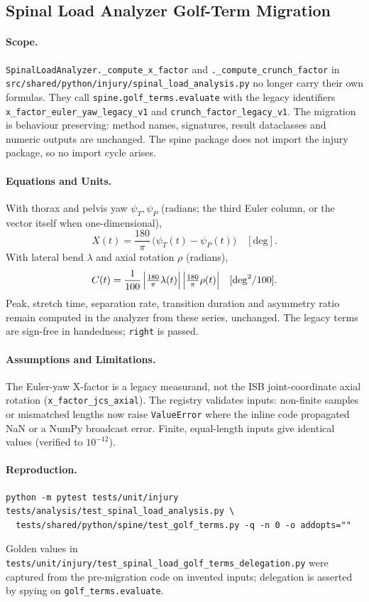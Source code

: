\subsection{Spinal Load Analyzer Golf-Term Migration}

\paragraph{Scope.}
\texttt{SpinalLoadAnalyzer.\_compute\_x\_factor} and
\texttt{.\_compute\_crunch\_factor} in
\texttt{src/shared/python/injury/spinal\_load\_analysis.py} no longer carry their
own formulas. They call \texttt{spine.golf\_terms.evaluate} with the legacy
identifiers \texttt{x\_factor\_euler\_yaw\_legacy\_v1} and
\texttt{crunch\_factor\_legacy\_v1}. The migration is behaviour preserving:
method names, signatures, result dataclasses and numeric outputs are unchanged.
The spine package does not import the injury package, so no import cycle arises.

\paragraph{Equations and Units.}
With thorax and pelvis yaw $\psi_T,\psi_P$ (radians; the third Euler column, or
the vector itself when one-dimensional),
\begin{equation}
  X(t) = \frac{180}{\pi}\,\bigl(\psi_T(t)-\psi_P(t)\bigr)\quad[\mathrm{deg}].
\end{equation}
With lateral bend $\lambda$ and axial rotation $\rho$ (radians),
\begin{equation}
  C(t) = \frac{1}{100}\,\Bigl|\tfrac{180}{\pi}\lambda(t)\Bigr|\,
         \Bigl|\tfrac{180}{\pi}\rho(t)\Bigr|\quad[\mathrm{deg}^2/100].
\end{equation}
Peak, stretch time, separation rate, transition duration and asymmetry ratio
remain computed in the analyzer from these series, unchanged. The legacy terms
are sign-free in handedness; \texttt{right} is passed.

\paragraph{Assumptions and Limitations.}
The Euler-yaw X-factor is a legacy measurand, not the ISB joint-coordinate
axial rotation (\texttt{x\_factor\_jcs\_axial}). The registry validates inputs:
non-finite samples or mismatched lengths now raise \texttt{ValueError} where the
inline code propagated NaN or a NumPy broadcast error. Finite, equal-length
inputs give identical values (verified to $10^{-12}$).

\paragraph{Reproduction.}
\begin{verbatim}
python -m pytest tests/unit/injury tests/analysis/test_spinal_load_analysis.py \
  tests/shared/python/spine/test_golf_terms.py -q -n 0 -o addopts=""
\end{verbatim}
Golden values in
\texttt{tests/unit/injury/test\_spinal\_load\_golf\_terms\_delegation.py} were
captured from the pre-migration code on invented inputs; delegation is asserted
by spying on \texttt{golf\_terms.evaluate}.
